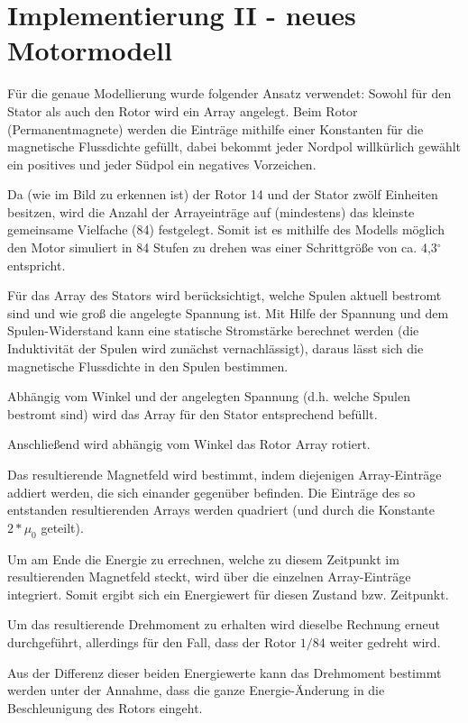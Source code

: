 \section{Implementierung II - neues Motormodell}
Für die genaue Modellierung wurde folgender Ansatz verwendet: Sowohl für den Stator als auch den Rotor wird ein Array angelegt. Beim Rotor (Permanentmagnete) werden die Einträge mithilfe einer Konstanten für die magnetische Flussdichte gefüllt, dabei bekommt jeder Nordpol willkürlich gewählt ein positives und jeder Südpol ein negatives Vorzeichen. 

Da (wie im Bild zu erkennen ist) der Rotor 14 und der Stator zwölf Einheiten besitzen, wird die Anzahl der Arrayeinträge auf (mindestens) das kleinste gemeinsame Vielfache (84) festgelegt. Somit ist es mithilfe des Modells möglich den Motor simuliert in 84 Stufen zu drehen was einer Schrittgröße von ca. 4,3$^{\circ}$ entspricht. 

Für das Array des Stators wird berücksichtigt, welche Spulen aktuell bestromt sind und wie groß die angelegte Spannung ist. Mit Hilfe der Spannung und dem Spulen-Widerstand kann eine statische Stromstärke berechnet werden (die Induktivität der Spulen wird zunächst vernachlässigt), daraus lässt sich die magnetische Flussdichte in den Spulen bestimmen. 

Abhängig vom Winkel und der angelegten Spannung (d.h. welche Spulen bestromt sind) wird das Array für den Stator entsprechend befüllt. 

Anschließend wird abhängig vom Winkel das Rotor Array rotiert. 

Das resultierende Magnetfeld wird bestimmt, indem diejenigen Array-Einträge addiert werden, die sich einander gegenüber befinden. 
Die Einträge des so entstanden resultierenden Arrays werden quadriert (und durch die Konstante $2*\mu_0$ geteilt). 

Um am Ende die Energie zu errechnen, welche zu diesem Zeitpunkt im resultierenden Magnetfeld steckt, wird über die einzelnen Array-Einträge integriert. 
Somit ergibt sich ein Energiewert für diesen Zustand bzw. Zeitpunkt. 

Um das resultierende Drehmoment zu erhalten wird dieselbe Rechnung erneut durchgeführt, allerdings für den Fall, dass der Rotor $1/84$ weiter gedreht wird. 

Aus der Differenz dieser beiden Energiewerte kann das Drehmoment bestimmt werden unter der Annahme, dass die ganze Energie-Änderung in die Beschleunigung des Rotors eingeht.

